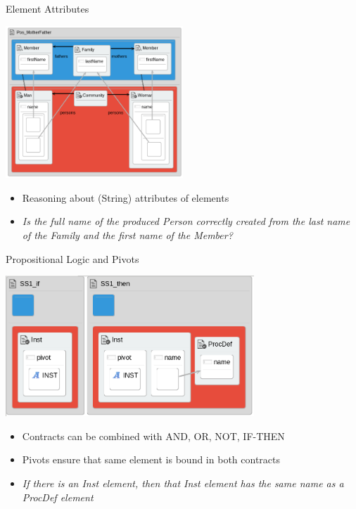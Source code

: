 \documentclass[xcolor=dvipsnames, 12pt, handout]{beamer}
\begin{document}
\begin{frame}{Element Attributes}
\begin{center}
\includegraphics[width=0.50\textwidth]{figures/Pos_MotherFather}
\end{center}
\pause
\begin{itemize}[<+->]
\item Reasoning about (String) attributes of elements
\item \textit{Is the full name of the produced Person correctly created from the last name of the Family and the first name of the Member?}
\end{itemize}
\end{frame}

\begin{frame}{Propositional Logic and Pivots}
\begin{center}
\begin{center}
\includegraphics[width=0.7\textwidth]{figures/syntactic_invariant}
\end{center}
\end{center}
\pause
\begin{itemize}[<+->]
\item Contracts can be combined with AND, OR, NOT, IF-THEN
\item Pivots ensure that same element is bound in both contracts
\item  \textit{If there is an Inst element, then that Inst element has the same name as a ProcDef element}
\end{itemize}
\end{frame}
\end{document}

